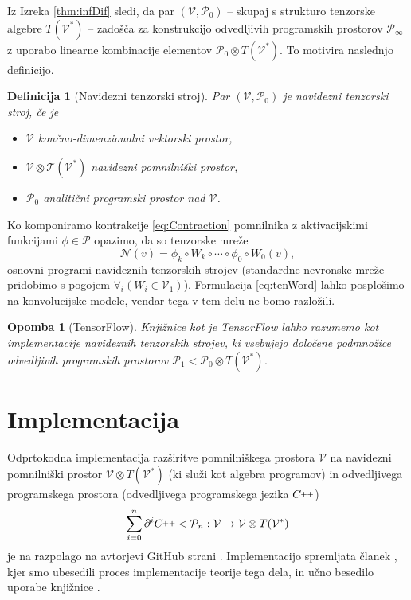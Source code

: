 \documentclass[a4paper, 12pt]{book}
\newcommand{\T}{\mathcal{T}}
\newcommand{\VV}{\mathcal{V}}
\newcommand{\NN}{\mathcal{N}}
\newcommand{\CC}{C\nolinebreak\hspace{-.05em}\raisebox{.4ex}{\tiny\bf +}\nolinebreak\hspace{-.10em}\raisebox{.4ex}{\tiny\bf +}}
\def\CC{{C\nolinebreak[4]\hspace{-.05em}\raisebox{.4ex}{\tiny\bf ++}}}
\newcommand{\dP}{\mathcal{P}}
\newcommand{\D}{\partial}
\newtheorem{opomba}{Opomba}[chapter]
\newtheorem{definicija}{Definicija}[chapter]
\begin{document}
Iz Izreka \ref{thm:infDif} sledi, da par $(\VV, \dP_0)$ -- skupaj s strukturo tenzorske algebre $T(\VV^*)$ -- zadošča za konstrukcijo odvedljivih programskih prostorov $\dP_\infty$ z uporabo linearne kombinacije elementov $\dP_0\otimes T(\VV^*)$. To motivira naslednjo definicijo.
\begin{definicija}[Navidezni tenzorski stroj]
Par $(\VV, \dP_0)$ je \emph{navidezni tenzorski stroj}, če je
\begin{itemize}
    \item
    $\VV$ končno-dimenzionalni vektorski prostor,
    \item
    $\VV\otimes \T(\VV^*)$ navidezni pomnilniški prostor,
    \item
    $\dP_0$ analitični programski prostor nad $\VV$.
    \end{itemize}
\end{definicija}

Ko komponiramo kontrakcije \eqref{eq:Contraction} pomnilnika z aktivacijskimi funkcijami $\phi\in\dP$ opazimo, da so tenzorske mreže \cite{opCalProg}
\begin{equation} \label{eq:tenWord}
\NN(v)=\phi_k\circ W_k\circ\cdots\circ\phi_0\circ W_0(v),
\end{equation}
osnovni programi navideznih tenzorskih strojev (standardne nevronske mreže pridobimo s pogojem $\forall_i(W_i\in\VV_1)$). Formulacija \eqref{eq:tenWord} lahko posplošimo na konvolucijske modele, vendar tega v tem delu ne bomo razložili.
\begin{opomba}[TensorFlow]
Knjižnice kot je TensorFlow \cite{TF} lahko razumemo kot implementacije navideznih tenzorskih strojev, ki vsebujejo določene podmnožice odvedljivih programskih prostorov $\dP_1<\dP_0\otimes T(\VV^*)$.
\end{opomba}

\section{Implementacija}\label{sec:implementacija}

Odprtokodna implementacija razširitve pomnilniškega prostora $\VV$ na navidezni pomnilniški prostor $\VV\otimes T(\VV^*)$ (ki služi kot algebra programov) in odvedljivega programskega prostora (odvedljivega programskega jezika $\CC$)
\begin{equation}
\sum\limits_{i=0}^n\D^i\CC<\dP_n:\VV\to\VV\otimes T(\VV^*)
\end{equation}
je na razpolago na avtorjevi GitHub strani \cite{dC++}. Implementacijo spremljata članek \cite{dC++Paper}, kjer smo ubesedili proces implementacije teorije tega dela, in učno besedilo uporabe knjižnice \cite{dC++Man}.
\end{document}
